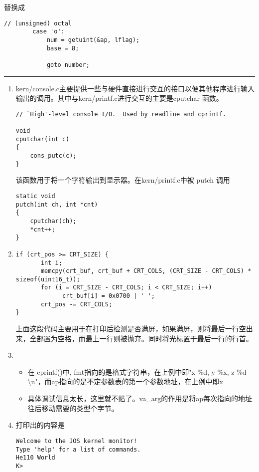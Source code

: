 \documentclass{article}
\newcommand{\funcname}[1]{{\ttfamily \small #1}}
\begin{document}
\begin{CJK*}{UTF8}{gkai}
替换成

\begin{lstlisting}[style=ccode, firstnumber=207, title={\scriptsize \ttfamily \bfseries lib/printfmt.c}]
        // (unsigned) octal
        case 'o':
            num = getuint(&ap, lflag);
            base = 8;

            goto number;
\end{lstlisting}

\vspace{2em}
\hrule
\vspace{2em}

\begin{enumerate}
\item{kern/console.c主要提供一些与硬件直接进行交互的接口以便其他程序进行输入输出的调用。其中与kern/printf.c进行交互的主要是\funcname{cputchar} 函数。

\begin{lstlisting}[style=ccode, firstnumber=455, title={\scriptsize \ttfamily \bfseries kern/console.c}]
// `High'-level console I/O.  Used by readline and cprintf.

void
cputchar(int c)
{
	cons_putc(c);
}
\end{lstlisting}

该函数用于将一个字符输出到显示器。在kern/printf.c中被 \funcname{putch} 调用

\begin{lstlisting}[style=ccode, firstnumber=9, title={\scriptsize \ttfamily \bfseries kern/printf.c}]
static void
putch(int ch, int *cnt)
{
	cputchar(ch);
	*cnt++;
}
\end{lstlisting}

}
\item{
\begin{lstlisting}[style=ccode, firstnumber=194, title={\scriptsize \ttfamily \bfseries kern/console.c}]
if (crt_pos >= CRT_SIZE) {
       int i;
       memcpy(crt_buf, crt_buf + CRT_COLS, (CRT_SIZE - CRT_COLS) * sizeof(uint16_t));
       for (i = CRT_SIZE - CRT_COLS; i < CRT_SIZE; i++)
             crt_buf[i] = 0x0700 | ' ';
       crt_pos -= CRT_COLS;
}
\end{lstlisting}

上面这段代码主要用于在打印后检测是否满屏，如果满屏，则将最后一行空出来，全部置为空格，而最上一行则被抛弃。同时将光标置于最后一行的行首。
}

\item{
\begin{itemize}
\item{ 在 \funcname{cprintf()}中, \funcname{fmt}指向的是格式字符串，在上例中即\funcname{"x \%d, y \%x, z \%d \textbackslash n"}，而\funcname{ap}指向的是不定参数表的第一个参数地址，在上例中即x}
\item{具体调试信息太长，这里就不贴了。\funcname{va\_arg}的作用是将ap每次指向的地址往后移动需要的类型个字节。}
\end{itemize}
}
\item{打印出的内容是
\begin{lstlisting}[style=console]
Welcome to the JOS kernel monitor!
Type 'help' for a list of commands.
He110 World
K> 
\end{lstlisting}

}
\end{enumerate}
\end{CJK*}
\end{document}
